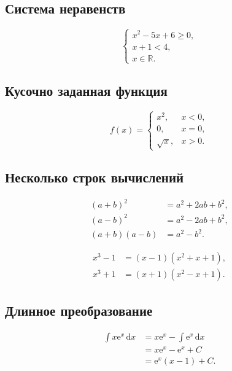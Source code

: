 \documentclass[12pt,a4paper]{article}
\theoremstyle{definition}
\theoremstyle{remark}
\newcommand{\R}{\mathbb{R}}
\newcommand{\dd}{\,\mathrm{d}}
\newcommand{\e}{\mathrm{e}}
\begin{document}
\subsection{Система неравенств}

\[
\begin{cases}
    x^2-5x+6\geq 0,\\
    x+1<4,\\
    x\in\R.
\end{cases}
\]

\subsection{Кусочно заданная функция}

\[
f(x)=
\begin{cases}
    x^2, & x<0,\\
    0,   & x=0,\\
    \sqrt{x}, & x>0.
\end{cases}
\]

\subsection{Несколько строк вычислений}

\begin{align}
    (a+b)^2
    &=a^2+2ab+b^2,\\
    (a-b)^2
    &=a^2-2ab+b^2,\\
    (a+b)(a-b)
    &=a^2-b^2.
\end{align}

\begin{align*}
    x^3-1
    &=(x-1)(x^2+x+1),\\
    x^3+1
    &=(x+1)(x^2-x+1).
\end{align*}

\subsection{Длинное преобразование}

\begin{align*}
    \int x\e^x\dd x
    &=
    x\e^x-\int\e^x\dd x\\
    &=
    x\e^x-\e^x+C\\
    &=
    \e^x(x-1)+C.
\end{align*}

\end{document}

